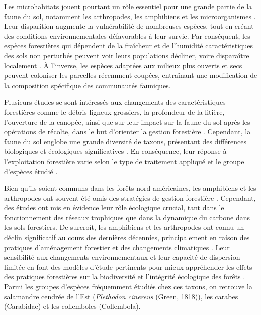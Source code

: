 Les microhabitats jouent pourtant un rôle essentiel pour une grande partie de la faune du sol, notamment les arthropodes, les amphibiens et les microorganismes \citep{Paillet2010Biodiversitydifferences,Fedrowitz2014Canretention,Chaudhary2016Impactforest}. 
Leur disparition augmente la vulnérabilité de nombreuses espèces, tout en créant des conditions environnementales défavorables à leur survie. 
Par conséquent, les espèces forestières qui dépendent de la fraîcheur et de l'humidité caractéristiques des sols non perturbés peuvent voir leurs populations décliner, voire disparaître localement \citep{Kudrin2023metaanalysiseffects}. 
À l'inverse, les espèces adaptées aux milieux plus ouverts et secs peuvent coloniser les parcelles récemment coupées, entraînant une modification de la composition spécifique des communautés fauniques.

Plusieurs études se sont intéressés aux changements des caractéristiques forestières comme le débris ligneux grossiers, la profondeur de la litière, l'ouverture de la canopée, 
ainsi que sur leur impact sur la faune du sol après les opérations de récolte, dans le but d'orienter la gestion forestière \citep{Semlitsch2002CriticalElements,McKenny2006Effectsstructural}. 
Cependant, la faune du sol englobe une grande diversité de taxons, présentant des différences biologiques et écologiques significatives \citep{Kudrin2023metaanalysiseffects}. 
En conséquence, leur réponse à l'exploitation forestière varie selon le type de traitement appliqué et le groupe d'espèces étudié \citep{Malmstrom2009Dynamicssoil,Paillet2010Biodiversitydifferences}.

Bien qu'ils soient communs dans les forêts nord-américaines, les amphibiens et les arthropodes ont souvent été omis des stratégies de gestion forestière \citep{deMaynadier1995relationshipforest}. 
Cependant, des études ont mis en évidence leur rôle écologique crucial, tant dans le fonctionnement des réseaux trophiques que dans la dynamique du carbone dans les sols forestiers. 
De surcroît, les amphibiens et les arthropodes ont connu un déclin significatif au cours des dernières décennies, principalement en raison des pratiques d'aménagement forestier et des changements climatiques \citep{Houlahan2000Quantitativeevidence,Stuart2004Statustrends,Warren2018projectedeffect,Wagner2021Insectdecline}. 
Leur sensibilité aux changements environnementaux et leur capacité de dispersion limitée en font des modèles d'étude pertinents pour mieux appréhender les effets des pratiques forestières 
sur la biodiversité et l'intégrité écologique des forêts \citep{pongeVerticalDistributionCollembola2000,Ojala2001Dispersalmicroarthropods,birdChangesSoilLitter2004,Maleque2009Arthropodsbioindicators}. 
Parmi les groupes d'espèces fréquemment étudiés chez ces taxons, on retrouve la salamandre cendrée de l'Est (\textit{Plethodon cinereus} (Green, 1818)), les carabes (Carabidae) et les collemboles (Collembola).

